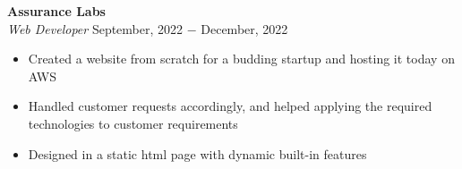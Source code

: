\documentclass{article}
\begin{document}
\noindent \textbf{Assurance Labs} \\
\textit{Web Developer} \hfill September, 2022 $-$ December, 2022
\begin{itemize}[noitemsep,nolistsep,leftmargin=*]
\item {Created a website from scratch for a budding startup and hosting it today on AWS}
\item {Handled customer requests accordingly, and helped applying the required technologies to customer requirements}
\item {Designed in a static html page with dynamic built-in features\\}
\end{itemize}



\end{document}
